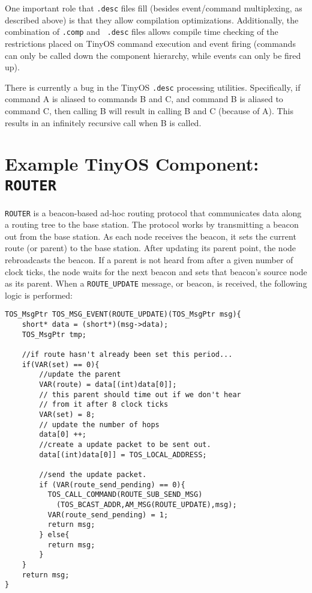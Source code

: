 \documentclass[12pt]{article}
\begin{document}
One important role that {\tt .desc} files fill (besides event/command
multiplexing, as described above) is that they allow compilation
optimizations. Additionally, the combination of {\tt .comp} and {\tt
.desc} files allows compile time checking of the restrictions placed
on TinyOS command execution and event firing (commands can only be
called down the component hierarchy, while events can only be fired
up).

There is currently a bug in the TinyOS {\tt .desc} processing
utilities. Specifically, if command A is aliased to commands B and C,
and command B is aliased to command C, then calling B will result in
calling B and C (because of A). This results in an infinitely
recursive call when B is called.

\section*{Example TinyOS Component: {\tt ROUTER}}

{\tt ROUTER} is a beacon-based ad-hoc routing protocol that communicates data
along a routing tree to the base station.
The protocol works by transmitting a beacon out from the base station.
As each node receives the beacon, it sets the current route (or parent)
to the base station.  After updating
its parent point, the node rebroadcasts the beacon.  If a parent is not
heard from after a given number of clock ticks, the node waits for the
next beacon and sets that beacon's source node as its parent.  When a
{\tt ROUTE\_UPDATE} message, or beacon, is received, the following logic
is performed:

\begin{verbatim}
TOS_MsgPtr TOS_MSG_EVENT(ROUTE_UPDATE)(TOS_MsgPtr msg){
    short* data = (short*)(msg->data);
    TOS_MsgPtr tmp;

    //if route hasn't already been set this period...
    if(VAR(set) == 0){
        //update the parent
        VAR(route) = data[(int)data[0]];
        // this parent should time out if we don't hear
        // from it after 8 clock ticks
        VAR(set) = 8;
        // update the number of hops
        data[0] ++;
        //create a update packet to be sent out.
        data[(int)data[0]] = TOS_LOCAL_ADDRESS;

        //send the update packet.
        if (VAR(route_send_pending) == 0){
          TOS_CALL_COMMAND(ROUTE_SUB_SEND_MSG)
            (TOS_BCAST_ADDR,AM_MSG(ROUTE_UPDATE),msg);
          VAR(route_send_pending) = 1;
          return msg;
        } else{
          return msg;
        }
    }
    return msg;
}
\end{verbatim}
\end{document}
